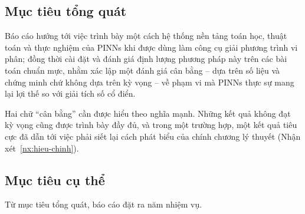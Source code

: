 \subsection{Mục tiêu tổng quát}
 
Báo cáo hướng tới việc trình bày một cách hệ thống nền tảng toán học, thuật toán
và thực nghiệm của PINNs khi được dùng làm công cụ giải phương trình vi phân;
đồng thời cài đặt và đánh giá định lượng phương pháp này trên các bài toán chuẩn
mực, nhằm xác lập một đánh giá cân bằng -- dựa trên số liệu và chứng minh chứ
không dựa trên kỳ vọng -- về phạm vi mà PINNs thực sự mang lại lợi thế so với giải
tích số cổ điển.
 
Hai chữ ``cân bằng'' cần được hiểu theo nghĩa mạnh. Những kết quả không đạt kỳ
vọng cũng được trình bày đầy đủ, và trong một trường hợp, một kết quả tiêu cực
đã dẫn tới việc phải siết lại cách phát biểu của chính chương lý thuyết
(Nhận xét~\ref{nx:hieu-chinh}).
 
\subsection{Mục tiêu cụ thể}
\label{subsec:mt-cu-the}
 
Từ mục tiêu tổng quát, báo cáo đặt ra năm nhiệm vụ.
 
